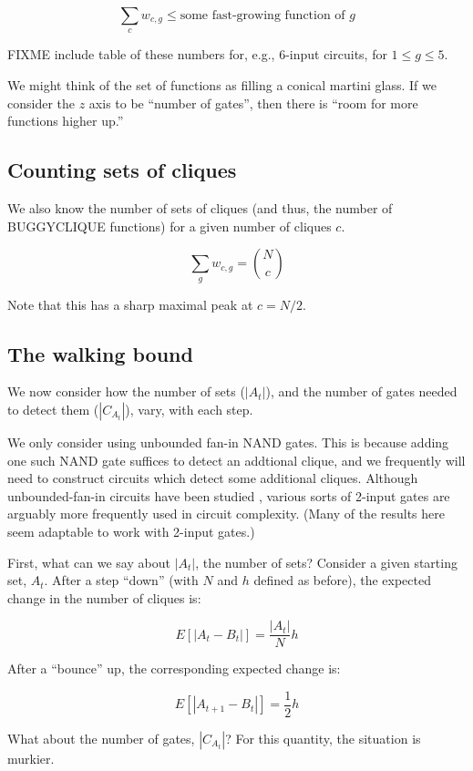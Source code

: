 \documentclass[12pt]{article}
\theoremstyle{definition}
\begin{document}
\[
\sum_c w_{c,g} \le \text{some fast-growing function of }g
\]

FIXME include table of these numbers for, e.g., 6-input circuits,
for $1 \le g \le 5$.

We might think of the set of functions as filling a conical
martini glass. If we consider the $z$ axis to be ``number of gates'',
then there is ``room for more functions higher up.''

\subsection{Counting sets of cliques}

We also know the number of sets of cliques (and thus, the number
of BUGGYCLIQUE functions) for a given number of cliques $c$.

\[
\sum_g w_{c,g} = {N \choose c}
\]

Note that this has a sharp maximal peak at $c = N/2$.

\subsection{The walking bound}

We now consider how the number of sets ($|A_t|$), and
the number of gates needed to detect them ($|C_{A_t}|$),
vary, with each step.

We only consider using unbounded fan-in NAND gates.
This is because adding one such NAND gate suffices to detect an
addtional clique, and we frequently will need to construct circuits which detect
some additional cliques.
Although unbounded-fan-in circuits have been studied
\cite{wegener1991complexity}\cite{allender1994depth}, various sorts of 2-input gates are arguably
more frequently used in circuit complexity. (Many of the results here
seem adaptable to work with 2-input gates.)

First, what can we say about $|A_t|$, the number of sets?
Consider a given starting set, $A_t$.
After a step ``down'' (with $N$ and $h$ defined as before),
the expected change in the number of cliques is:

\[
E[|A_t - B_t|] = \frac{|A_t|}{N}h
\]

After a ``bounce'' up, the corresponding expected change is:

\[
E[|A_{t+1} - B_t|] = \frac{1}{2}h
\]

What about the number of gates, $|C_{A_t}|$? For this quantity,
the situation is murkier.
\end{document}
